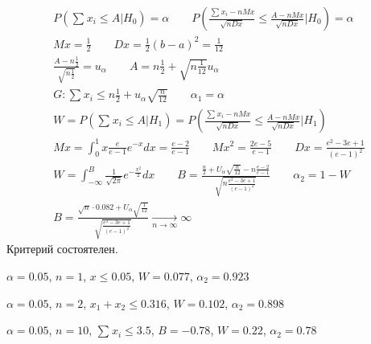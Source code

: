 \documentclass{article}
\begin{document}
\begin{eg}[Т11 из задания]
\begin{gather*}
    P(\sum_{}^{}x_i \le A | H_0) = \alpha \qquad P(\frac{\sum_{}^{}x_i-nMx}{\sqrt{nDx}}\le \frac{A-nMx}{\sqrt{nDx}}|H_0)=\alpha \\ 
    Mx=\frac{1}{2} \qquad Dx = \frac{1}{2}(b-a)^{2}=\frac{1}{12} \\ 
    \frac{A-n\frac{1}{2}}{\sqrt{n\frac{1}{2}}}=u_\alpha \qquad A = n\frac{1}{2}+\sqrt{n\frac{1}{12}}u_\alpha \\ 
    G: \sum_{}^{}x_i \le n\frac{1}{2} + u_\alpha\sqrt{\frac{n}{12}} \qquad \alpha_1=\alpha \\
    W=P(\sum_{}^{}x_i \le A | H_1)=P(\frac{\sum_{}^{}x_i-nMx}{\sqrt{nDx}}\le \frac{A-nMx}{\sqrt{nDx}}|H_1) \\ 
    Mx = \int_{0}^{1}x \frac{e}{e-1}e^{-x}dx = \frac{e-2}{e-1} \qquad Mx^{2}=\frac{2e-5}{e-1} \qquad Dx=\frac{e^{2}-3e+1}{(e-1)^{2}} \\ 
    W = \int_{-\infty}^{B}\frac{1}{\sqrt{2\pi}}e^{-\frac{x^{2}}{2}}dx \qquad B=\frac{\frac{n}{2}+U_\alpha\sqrt{\frac{n}{12}}-n\frac{e-2}{e-1}}{\sqrt{n\frac{e^{2}-3e+1}{(e-1)^{2}}}} \qquad \alpha_2 = 1- W \\
    B=\frac{\sqrt{n}\cdot 0.082 + U_\alpha \sqrt{\frac{1}{12}}}{\sqrt{\frac{e^{2}-3e+1}{(e-1)^{2}}}} \underset{n\to\infty}{\to}\infty
  \end{gather*}
  Критерий состоятелен.

  \hr
  $\alpha=0.05$, $n=1$, $x \le 0.05$, $W=0.077$, $\alpha_2=0.923$

  $\alpha=0.05$, $n=2$, $x_1+x_2 \le 0.316$, $W=0.102$, $\alpha_2=0.898$

  $\alpha=0.05$, $n=10$, $\sum_{}^{}x_i \le 3.5$, $B=-0.78$, $W=0.22$, $\alpha_2=0.78$
\end{eg}
\end{document}
